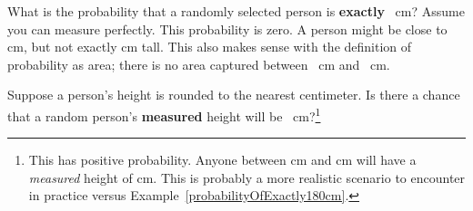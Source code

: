 \begin{example}{What is the probability that a randomly selected person is \textbf{exactly} ~cm? Assume you can measure perfectly.}
\label{probabilityOfExactly180cm}
This probability is zero. A person might be close to  cm, but not exactly  cm tall. This also makes sense with the definition of probability as area; there is no area captured between ~cm and ~cm.
\end{example}

\begin{exercise}
Suppose a person's height is rounded to the nearest centimeter. Is there a chance that a random person's \textbf{measured} height will be ~cm?\footnote{This has positive probability. Anyone between  cm and  cm will have a \emph{measured} height of  cm. This is probably a more realistic scenario to encounter in practice versus Example~\ref{probabilityOfExactly180cm}.}
\end{exercise}




